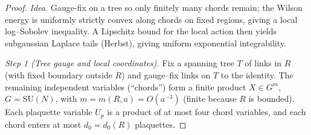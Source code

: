 \documentclass[11pt]{amsart}
\theoremstyle{plain}
\theoremstyle{definition}
\theoremstyle{remark}
\begin{document}
\begin{proof}
\emph{Idea.} Gauge-fix on a tree so only finitely many chords remain; the Wilson energy is uniformly strictly convex along chords on fixed regions, giving a local log–Sobolev inequality. A Lipschitz bound for the local action then yields subgaussian Laplace tails (Herbst), giving uniform exponential integrability.

\medskip
\emph{Step 1 (Tree gauge and local coordinates).} Fix a spanning tree $T$ of links in $R$ (with fixed boundary outside $R$) and gauge--fix links on $T$ to the identity. The remaining independent variables (``chords'') form a finite product $X\in G^{m}$, $G=\mathrm{SU}(N)$, with $m=m(R,a)=O(a^{-3})$ (finite because $R$ is bounded). Each plaquette variable $U_p$ is a product of at most four chord variables, and each chord enters at most $d_0=d_0(R)$ plaquettes.


\end{proof}
\end{document}
